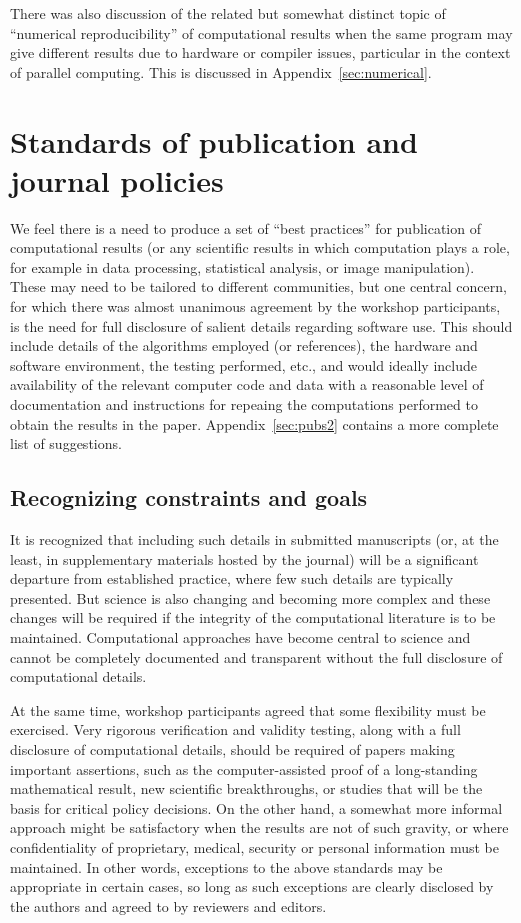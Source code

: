 \documentclass[11pt]{article}
\begin{document}
There was also discussion of
the related but somewhat distinct topic of ``numerical reproducibility''
of computational results when the same program may give different results
due to hardware or compiler issues, particular in the context of parallel 
computing.  This is discussed in Appendix~\ref{sec:numerical}.


\section{Standards of publication and journal policies} \label{sec:pubs}
We feel there is a need to produce a set of ``best practices'' 
for publication of computational results (or any scientific results in which
computation plays a role, for example in data processing, statistical
analysis, or image manipulation).   
These may need to be tailored to different communities, but one
central concern, for which there was almost unanimous agreement by
the workshop participants, is the need for full disclosure of salient
details regarding software use. This should include details of the
algorithms employed (or references), the hardware and software environment,
the testing performed, etc., and would ideally include availability of the
relevant computer code and data with a reasonable level of documentation and
instructions for repeaing the computations performed to obtain the results
in the paper. Appendix~\ref{sec:pubs2} contains a more complete list of
suggestions.

\subsection{Recognizing constraints and goals}
It is recognized that including such details in submitted manuscripts (or,
at the least, in supplementary materials hosted by the journal) 
will be a significant departure
from established practice, where few such details are typically presented.
But science is also changing and becoming more complex and these changes
will be required if the integrity of the computational literature is to be
maintained.
Computational approaches have become central to
science and cannot be completely documented and transparent without the
full disclosure of computational details.  

At the same time, workshop participants agreed that some flexibility must be
exercised.  Very rigorous verification and validity testing, along with a
full disclosure of computational details, should be required of papers making
important assertions, such as the computer-assisted proof of a long-standing
mathematical result, new scientific breakthroughs, or studies that will be
the basis for critical policy decisions.  
On the other hand, a
somewhat more informal approach might be satisfactory when the results are
not of such gravity, or where confidentiality of proprietary, medical,
security or personal information must be maintained.  In other words,
exceptions to the above standards may be appropriate in certain cases, so
long as such exceptions are clearly disclosed by the authors and agreed to
by reviewers and editors.
\end{document}
